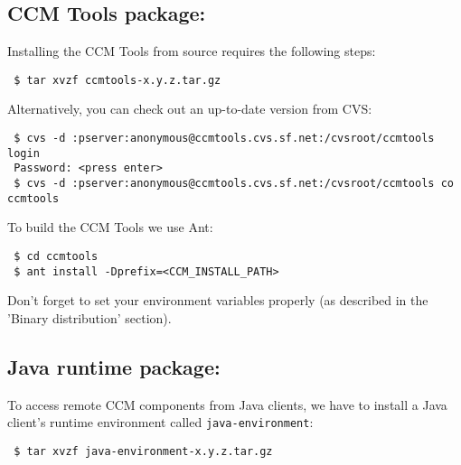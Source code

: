 \subsection{CCM Tools package:}
Installing the CCM Tools from source requires the following steps:

\begin{small}
\begin{verbatim} 
 $ tar xvzf ccmtools-x.y.z.tar.gz
\end{verbatim}
\end{small}

\noindent
Alternatively, you can check out an up-to-date version from CVS:
\begin{small}
\begin{verbatim}
 $ cvs -d :pserver:anonymous@ccmtools.cvs.sf.net:/cvsroot/ccmtools login
 Password: <press enter>
 $ cvs -d :pserver:anonymous@ccmtools.cvs.sf.net:/cvsroot/ccmtools co ccmtools
\end{verbatim}
\end{small}

\noindent
To build the CCM Tools we use Ant: 
\begin{small}
\begin{verbatim}
 $ cd ccmtools
 $ ant install -Dprefix=<CCM_INSTALL_PATH>
\end{verbatim}
\end{small}

\noindent
Don't forget to set your environment variables properly
(as described in the 'Binary distribution' section). 


\subsection{Java runtime package:}
To access remote CCM components from Java clients, we have to install
a Java client's runtime environment called {\tt java-environment}:

\begin{small}
\begin{verbatim}
 $ tar xvzf java-environment-x.y.z.tar.gz
\end{verbatim}
\end{small}

